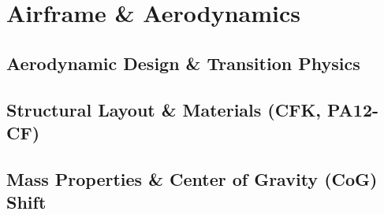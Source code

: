 ﻿\chapter{Airframe \& Aerodynamics}
\label{ch:aerodynamics}
\section{Aerodynamic Design \& Transition Physics}
\section{Structural Layout \& Materials (CFK, PA12-CF)}
\section{Mass Properties \& Center of Gravity (CoG) Shift}
